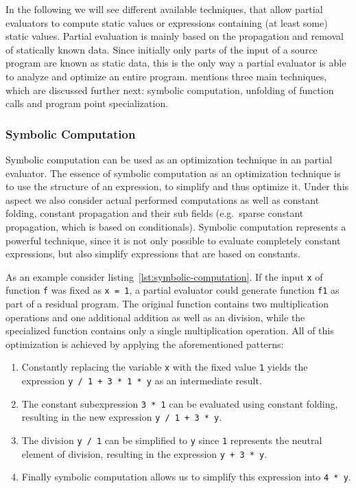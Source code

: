 In the following we will see different available techniques, that allow partial evaluators to compute static values or expressions containing (at least some) static values.
Partial evaluation is mainly based on the propagation and removal of statically known data.
Since initially only parts of the input of a source program are known as static data, this is the only way a partial evaluator is able to analyze and optimize an entire program.
 mentions three main techniques, which are discussed further next: symbolic computation, unfolding of function calls and program point specialization.

\subsubsection*{Symbolic Computation}

Symbolic computation can be used as an optimization technique in an partial evaluator.
The essence of symbolic computation as an optimization technique is to use the structure of an expression, to simplify and thus optimize it.
Under this aspect we also consider actual performed computations as well as constant folding, constant propagation and their sub fields (e.g.\ sparse constant propagation, which is based on conditionals).
Symbolic computation represents a powerful technique, since it is not only possible to evaluate completely constant expressions, but also simplify expressions that are based on constants.

As an example consider listing~\ref{lst:symbolic-computation}.
If the input \texttt{x} of function \texttt{f} was fixed as \texttt{x = 1}, a partial evaluator could generate function \texttt{f1} as part of a residual program.
The original function contains two multiplication operations and one additional addition as well as an division, while the specialized function contains only a single multiplication operation.
All of this optimization is achieved by applying the aforementioned patterns:

\begin{enumerate}
\item Constantly replacing the variable \texttt{x} with the fixed value \texttt{1} yields the expression \linebreak \texttt{y / 1 + 3 * 1 * y} as an intermediate result.
\item The constant subexpression \texttt{3 * 1} can be evaluated using constant folding, resulting in the new expression \texttt{y / 1 + 3 * y}.
\item The division \texttt{y / 1} can be simplified to \texttt{y} since \texttt{1} represents the neutral element of division, resulting in the expression \texttt{y + 3 * y}.
\item Finally symbolic computation allows us to simplify this expression into \texttt{4 * y}.
\end{enumerate}

